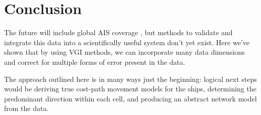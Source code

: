 \section{Conclusion}



The future will include global AIS coverage \cite{JonesGoogle2012,carson2012satellite}, but methods to validate and integrate this data into a scientifically useful system don't yet exist. Here we've shown that by using VGI methods, we can incorporate many data dimensions and correct for multiple forms of error present in the data.

The approach outlined here is in many ways just the beginning: logical next steps would be deriving true cost-path movement models for the ships, determining the predominant direction within each cell, and producing an abstract network model from the data.





